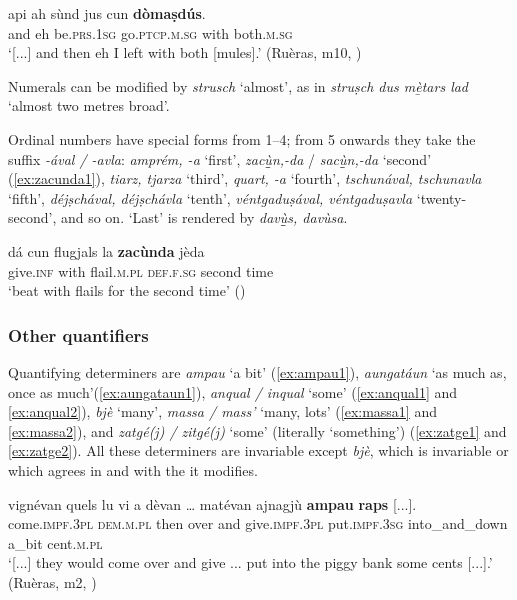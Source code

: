 \ea\label{ex:domasdus1}
\gll  [...] api ah sùnd jus cun \textbf{dòmaṣdús}.  \\
{} and eh be.\textsc{prs.1sg} go.\textsc{ptcp.m.sg} with both.\textsc{m.sg} \\
\glt `[...] and then eh I left with both [mules].' (Ruèras, m10, )
\z

Numerals can be modified by \textit{strusch} `almost', as in \textit{struṣch dus m{\`e̱}tars lad} `almost two metres broad'.

Ordinal numbers have special forms from 1--4; from 5 onwards they take the suffix \textit{-ával /  -avla}: \textit{amprém, -a} `first', \textit{zac{\`u̱̱}n,-da} / \textit{sac{\`u̱̱}n,-da} `second' (\ref{ex:zacunda1}), \textit{tiarz, tjarza} `third', \textit{quart, -a} `fourth', \textit{tschunával, tschunavla}  `fifth', \textit{déjṣchával, déjṣchávla} `tenth', \textit{ véntgaduṣával, véntgaduṣavla} `twenty-second', and so on. `Last' is rendered by \textit{dav{\`u̱̱}s, davùsa}.

\ea\label{ex:zacunda1}
\gll  dá cun flugjals la \textbf{zacùnda} jèda\\
    give.\textsc{inf} with flail.\textsc{m.pl} \textsc{def.f.sg} second time \\
\glt `beat with flails for the second time' ()
\z

\subsubsection{Other quantifiers}\label{3.2.5.2}
Quantifying determiners are \textit{ampau} `a bit' (\ref{ex:ampau1}), \textit{aungatáun} `as much as, once as much'(\ref{ex:aungataun1}), \textit{anqual / inqual} `some' (\ref{ex:anqual1} and \ref{ex:anqual2}), \textit{bjè} `many', \textit{massa / mass'} `many, lots' (\ref{ex:massa1} and \ref{ex:massa2}), and \textit{zatgé(j) / zitgé(j)} `some' (literally `something') (\ref{ex:zatge1} and \ref{ex:zatge2}). All these determiners are invariable except \textit{bjè}, which is invariable or which agrees in  and  with the  it modifies.


\ea\label{ex:ampau1}
\gll    [...] vignévan quels lu vi a dèvan … matévan ajnagjù \textbf{ampau} \textbf{raps} [...].\\
 {} come.\textsc{impf.3pl} \textsc{dem.m.pl} then over and give.\textsc{impf.3pl} {} put.\textsc{impf.3sg} into\_and\_down a\_bit cent.\textsc{m.pl}\\
\glt `[...] they would come over and give ... put into the piggy bank some cents [...].' (Ruèras, m2, )
\z


